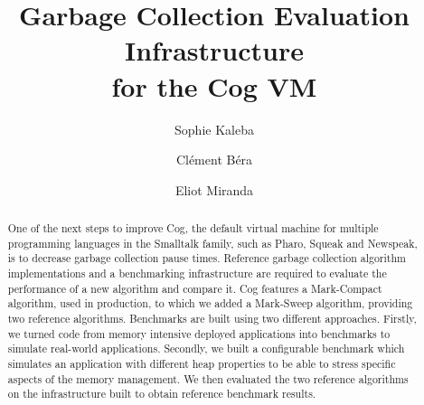 \documentclass[10pt, sigplan]{acmart}
\begin{document}
\title[Garbage Collection Evaluation Infrastructure]{Garbage Collection Evaluation Infrastructure\\ for the Cog VM}

\author{Sophie Kaleba}

\author{Cl\'ement B\'era}

\author{Eliot Miranda}

\begin{abstract}
One of the next steps to improve Cog, the default virtual machine for multiple programming languages in the Smalltalk family, such as Pharo, Squeak and Newspeak, is to decrease garbage collection pause times. Reference garbage collection algorithm implementations and a benchmarking infrastructure are required to evaluate the performance of a new algorithm and compare it. Cog features a Mark-Compact algorithm, used in production, to which we added a Mark-Sweep algorithm, providing two reference algorithms. Benchmarks are built using two different approaches. Firstly, we turned code from memory intensive deployed applications into benchmarks to simulate real-world applications. Secondly, we built a configurable benchmark which simulates an application with different heap properties to be able to stress specific aspects of the memory management. We then evaluated the two reference algorithms on the infrastructure built to obtain reference benchmark results.
\end{abstract}
\end{document}
